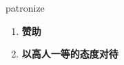 
\begin{frame}
{\huge patronize}
\begin{center}
\begin{enumerate}\Large
  \item \textbf{赞助}
  \item \textbf{以高人一等的态度对待}
\end{enumerate}
\end{center}
\end{frame}
